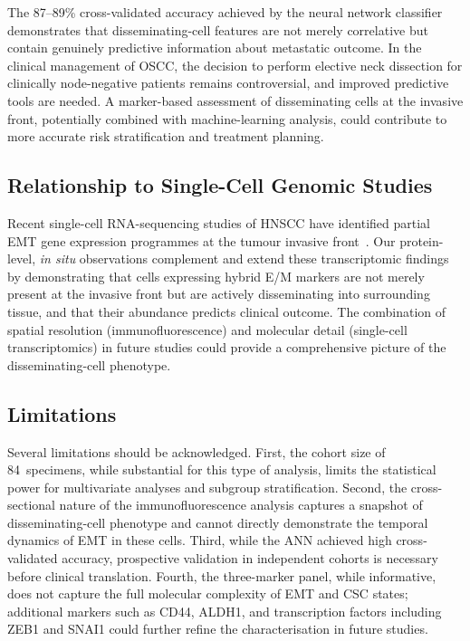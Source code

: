 \documentclass[11pt,a4paper]{article}
\begin{document}
The 87--89\% cross-validated accuracy achieved by the neural network classifier demonstrates that disseminating-cell features are not merely correlative but contain genuinely predictive information about metastatic outcome. In the clinical management of OSCC, the decision to perform elective neck dissection for clinically node-negative patients remains controversial, and improved predictive tools are needed. A marker-based assessment of disseminating cells at the invasive front, potentially combined with machine-learning analysis, could contribute to more accurate risk stratification and treatment planning.

\subsection{Relationship to Single-Cell Genomic Studies}

Recent single-cell RNA-sequencing studies of HNSCC have identified partial EMT gene expression programmes at the tumour invasive front~\cite{puram2017}. Our protein-level, \textit{in situ} observations complement and extend these transcriptomic findings by demonstrating that cells expressing hybrid E/M markers are not merely present at the invasive front but are actively disseminating into surrounding tissue, and that their abundance predicts clinical outcome. The combination of spatial resolution (immunofluorescence) and molecular detail (single-cell transcriptomics) in future studies could provide a comprehensive picture of the disseminating-cell phenotype.

\subsection{Limitations}

Several limitations should be acknowledged. First, the cohort size of 84~specimens, while substantial for this type of analysis, limits the statistical power for multivariate analyses and subgroup stratification. Second, the cross-sectional nature of the immunofluorescence analysis captures a snapshot of disseminating-cell phenotype and cannot directly demonstrate the temporal dynamics of EMT in these cells. Third, while the ANN achieved high cross-validated accuracy, prospective validation in independent cohorts is necessary before clinical translation. Fourth, the three-marker panel, while informative, does not capture the full molecular complexity of EMT and CSC states; additional markers such as CD44, ALDH1, and transcription factors including ZEB1 and SNAI1 could further refine the characterisation in future studies.
\end{document}
